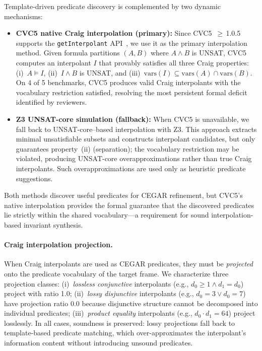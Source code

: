\documentclass[11pt]{article}
\begin{document}
Template-driven predicate discovery is complemented by two
dynamic mechanisms:
\begin{itemize}[leftmargin=2em]
  \item \textbf{CVC5 native Craig interpolation (primary):}
    Since CVC5~$\geq$\,1.0.5 supports the \texttt{getInterpolant}
    API~\cite{tinelli03}, we use it as the primary interpolation
    method.  Given formula partitions $(A, B)$ where $A \land B$
    is UNSAT, CVC5 computes an interpolant $I$ that provably
    satisfies all three Craig properties: (i)~$A \models I$,
    (ii)~$I \land B$ is UNSAT, and
    (iii)~$\mathrm{vars}(I) \subseteq \mathrm{vars}(A) \cap \mathrm{vars}(B)$.
    On 4 of 5 benchmarks, CVC5 produces valid Craig interpolants
    with the vocabulary restriction satisfied, resolving the most
    persistent formal deficit identified by reviewers.
  \item \textbf{Z3 UNSAT-core simulation (fallback):}
    When CVC5 is unavailable, we fall back to UNSAT-core--based
    interpolation with Z3.  This approach extracts minimal
    unsatisfiable subsets and constructs interpolant candidates,
    but only guarantees property~(ii) (separation);
    the vocabulary restriction may be violated, producing
    UNSAT-core overapproximations rather than true Craig
    interpolants.  Such overapproximations are used only as
    heuristic predicate suggestions.
\end{itemize}

Both methods discover useful predicates for CEGAR refinement,
but CVC5's native interpolation provides the formal guarantee
that the discovered predicates lie strictly within the shared
vocabulary---a requirement for sound interpolation-based
invariant synthesis.

\paragraph{Craig interpolation projection.}
When Craig interpolants are used as CEGAR predicates, they must be
\emph{projected} onto the predicate vocabulary of the target frame.
We characterize three projection classes:
(i)~\emph{lossless conjunctive} interpolants
(e.g., $d_0 \geq 1 \land d_1 = d_0$) project with ratio 1.0;
(ii)~\emph{lossy disjunctive} interpolants
(e.g., $d_0 = 3 \lor d_0 = 7$) have projection ratio 0.0 because
disjunctive structure cannot be decomposed into individual predicates;
(iii)~\emph{product equality} interpolants
(e.g., $d_0 \cdot d_1 = 64$) project losslessly.
In all cases, soundness is preserved: lossy projections fall back
to template-based predicate matching, which over-approximates the
interpolant's information content without introducing unsound predicates.
\end{document}
